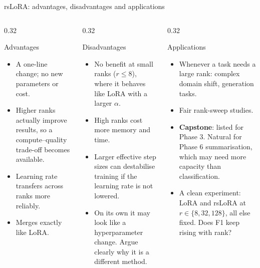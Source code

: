 \documentclass[aspectratio=169,11pt]{beamer}
\begin{document}
\begin{frame}{rsLoRA: advantages, disadvantages and applications}
  \begin{columns}[T]
    \begin{column}{0.32\textwidth}
      \begin{exampleblock}{Advantages}
        \scriptsize
        \begin{itemize}
          \item A one-line change; no new parameters or cost.
          \item Higher ranks actually improve results, so a compute--quality trade-off becomes available.
          \item Learning rate transfers across ranks more reliably.
          \item Merges exactly like LoRA.
        \end{itemize}
      \end{exampleblock}
    \end{column}
    \begin{column}{0.32\textwidth}
      \begin{alertblock}{Disadvantages}
        \scriptsize
        \begin{itemize}
          \item No benefit at small ranks ($r\le8$), where it behaves like LoRA with a larger $\alpha$.
          \item High ranks cost more memory and time.
          \item Larger effective step sizes can destabilise training if the learning rate is not lowered.
          \item On its own it may look like a hyperparameter change. Argue clearly why it is a different method.
        \end{itemize}
      \end{alertblock}
    \end{column}
    \begin{column}{0.32\textwidth}
      \begin{block}{Applications}
        \scriptsize
        \begin{itemize}
          \item Whenever a task needs a large rank: complex domain shift, generation tasks.
          \item Fair rank-sweep studies.
          \item \textbf{Capstone}: listed for Phase 3. Natural for Phase 6 summarisation, which may need more capacity than classification.
          \item A clean experiment: LoRA and rsLoRA at $r\in\{8,32,128\}$, all else fixed. Does F1 keep rising with rank?
        \end{itemize}
      \end{block}
    \end{column}
  \end{columns}
\end{frame}
\end{document}
